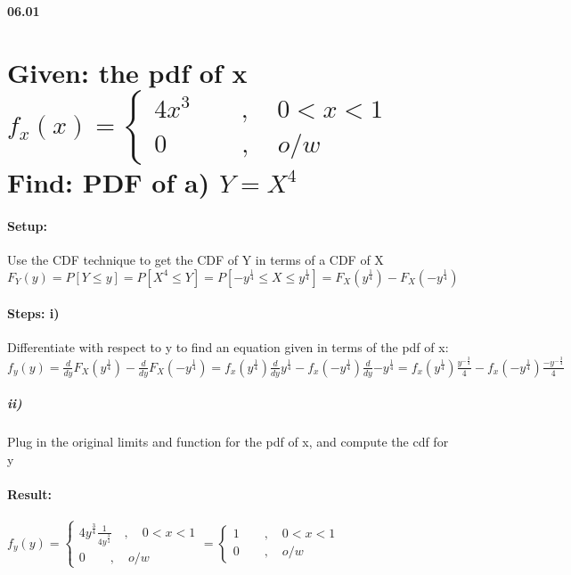 
{\bf 06.01} 
\section*{Given: the pdf of x ${f}_{x} \left( x \right) =\begin{cases} 4{ x }^{ 3 }\quad \quad ,\quad 0<x<1 \\ 0\quad \quad \quad ,\quad o/w \end{cases}$\\Find: PDF of  a) $Y={ X }^{ 4 }$}

\paragraph{Setup:} Use the CDF technique to get the CDF of Y in terms of a CDF of X\\${ F }_{ Y }(y)=P[Y\le y]=P[{ X }^{ 4 }\le Y]=P[{ -y }^{ \frac { 1 }{ 4 }  }\le X\le { y }^{ \frac { 1 }{ 4 }  }]={ F }_{ X }({ y }^{ \frac { 1 }{ 4 }  })-{ F }_{ X }(-{ y }^{ \frac { 1 }{ 4 }  })$

\paragraph{Steps: i)} Differentiate with respect to y to find an equation given in terms of the pdf of x:\\ ${ f }_{ y }(y)=\frac { d }{ dy } { F }_{ X }({ y }^{ \frac { 1 }{ 4 }  })-\frac { d }{ dy } { F }_{ X }(-{ y }^{ \frac { 1 }{ 4 }  })={ f }_{ x }({ y }^{ \frac { 1 }{ 4 }  })\frac { d }{ dy } { y }^{ \frac { 1 }{ 4 }  }-{ f }_{ x }(-{ y }^{ \frac { 1 }{ 4 }  })\frac { d }{ dy } { -y }^{ \frac { 1 }{ 4 }  }={ f }_{ x }({ y }^{ \frac { 1 }{ 4 }  })\frac { { y }^{ -\frac { 3 }{ 4 }  } }{ 4 } -{ f }_{ x }(-{ y }^{ \frac { 1 }{ 4 }  })\frac { { -y }^{ -\frac { 3 }{ 4 }  } }{ 4 } $

\subparagraph{ii)} Plug in the original limits and function for the pdf of x, and compute the cdf for y

\paragraph{Result:} ${ f }_{ y }(y)=\begin{cases} { 4y }^{ \frac { 3 }{ 4 }  }\frac { 1 }{ { 4y }^{ \frac { 3 }{ 4 }  } } \quad ,\quad 0<x<1 \\ 0\quad  \quad ,\quad o/w \end{cases}=\begin{cases} 1 \quad \quad ,\quad 0<x<1\\ 0 \quad \quad ,\quad o/w \end{cases}$


